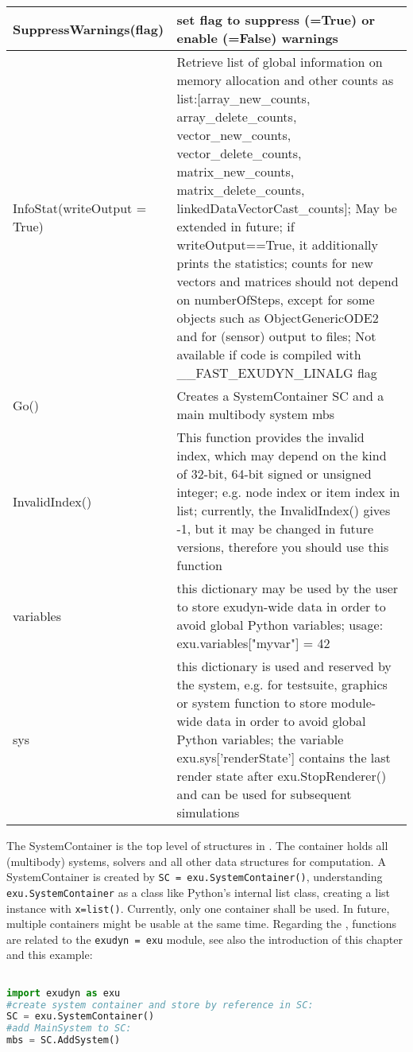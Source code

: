 \begin{center}
\begin{longtable}{| p{8cm} | p{8cm} |}
  SuppressWarnings(flag) & set flag to suppress (=True) or enable (=False) warnings\\ \hline 
  InfoStat(writeOutput = True) & Retrieve list of global information on memory allocation and other counts as list:[array\_new\_counts, array\_delete\_counts, vector\_new\_counts, vector\_delete\_counts, matrix\_new\_counts, matrix\_delete\_counts, linkedDataVectorCast\_counts]; May be extended in future; if writeOutput==True, it additionally prints the statistics; counts for new vectors and matrices should not depend on numberOfSteps, except for some objects such as ObjectGenericODE2 and for (sensor) output to files; Not available if code is compiled with \_\_FAST\_EXUDYN\_LINALG flag\\ \hline 
  Go() & Creates a SystemContainer SC and a main multibody system mbs\\ \hline 
  InvalidIndex() & This function provides the invalid index, which may depend on the kind of 32-bit, 64-bit signed or unsigned integer; e.g. node index or item index in list; currently, the InvalidIndex() gives -1, but it may be changed in future versions, therefore you should use this function\\ \hline 
  variables & this dictionary may be used by the user to store exudyn-wide data in order to avoid global Python variables; usage: exu.variables["myvar"] = 42 \\ \hline  
  sys & this dictionary is used and reserved by the system, e.g. for testsuite, graphics or system function to store module-wide data in order to avoid global Python variables; the variable exu.sys['renderState'] contains the last render state after exu.StopRenderer() and can be used for subsequent simulations \\ \hline  
\end{longtable}
\end{center}




The SystemContainer is the top level of structures in \codeName. The container holds all (multibody) systems, solvers and all other data structures for computation. A SystemContainer is created by \texttt{SC = exu.SystemContainer()}, understanding \texttt{exu.SystemContainer} as a class like Python's internal list class, creating a list instance with \texttt{x=list()}. Currently, only one container shall be used. In future, multiple containers might be usable at the same time. Regarding the , functions are related to the \texttt{exudyn = exu} module, see also the introduction of this chapter and this example:
\pythonstyle
\begin{lstlisting}[language=Python, firstnumber=1]

import exudyn as exu
#create system container and store by reference in SC:
SC = exu.SystemContainer() 
#add MainSystem to SC:
mbs = SC.AddSystem()
\end{lstlisting}


